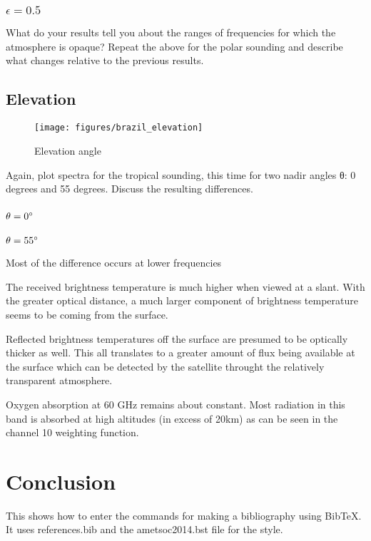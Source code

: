 \documentclass[twocol]{ametsoc}
\begin{document}
\subsubsection{$\epsilon = 0.5$}
What do your results tell you about the ranges of frequencies for which the atmosphere is opaque?
Repeat the above for the polar sounding and describe what changes relative to the previous results.

\subsection{Elevation}


\begin{figure}
	\centering
	\texttt{[image: figures/brazil\_elevation]}
	\caption{Elevation angle}
	\label{fig:elevation}
\end{figure}

Again, plot spectra for the tropical sounding, this time for two nadir angles θ:  0 degrees and 55 degrees.  Discuss the resulting differences.
\subsubsection{$\theta = 0 \degree{} $}
\subsubsection{$\theta = 55 \degree{} $}

Most of the difference occurs at lower frequencies

The received brightness temperature is much higher when viewed at a slant. With the greater optical distance, a much larger component of brightness temperature seems to be coming from the surface. 

Reflected brightness temperatures off the surface are presumed to be optically thicker as well. This all translates to a greater amount of flux being available at the surface which can be detected by the satellite throught the relatively transparent atmosphere.

Oxygen absorption at 60 GHz remains about constant. Most radiation in this band is absorbed at high altitudes (in excess of 20km) as can be seen in the channel 10 weighting function.


\section{Conclusion}

 This shows how to enter the commands for making a bibliography using
 BibTeX. It uses references.bib and the ametsoc2014.bst file for the style.

 
 
\end{document}
